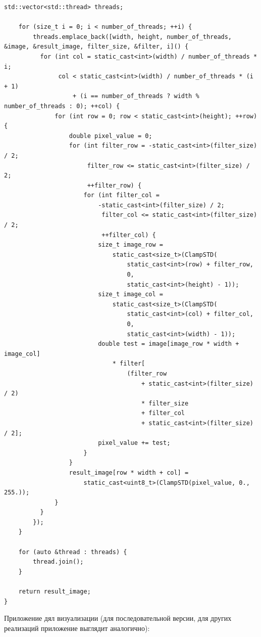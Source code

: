 \documentclass{report}
\begin{document}
\begin{lstlisting}[breaklines=true]
    std::vector<std::thread> threads;

    for (size_t i = 0; i < number_of_threads; ++i) {
        threads.emplace_back([width, height, number_of_threads, &image, &result_image, filter_size, &filter, i]() {
          for (int col = static_cast<int>(width) / number_of_threads * i;
               col < static_cast<int>(width) / number_of_threads * (i + 1)
                   + (i == number_of_threads ? width % number_of_threads : 0); ++col) {
              for (int row = 0; row < static_cast<int>(height); ++row) {
                  double pixel_value = 0;
                  for (int filter_row = -static_cast<int>(filter_size) / 2;
                       filter_row <= static_cast<int>(filter_size) / 2;
                       ++filter_row) {
                      for (int filter_col =
                          -static_cast<int>(filter_size) / 2;
                           filter_col <= static_cast<int>(filter_size) / 2;
                           ++filter_col) {
                          size_t image_row =
                              static_cast<size_t>(ClampSTD(
                                  static_cast<int>(row) + filter_row,
                                  0,
                                  static_cast<int>(height) - 1));
                          size_t image_col =
                              static_cast<size_t>(ClampSTD(
                                  static_cast<int>(col) + filter_col,
                                  0,
                                  static_cast<int>(width) - 1));
                          double test = image[image_row * width + image_col]
                              * filter[
                                  (filter_row
                                      + static_cast<int>(filter_size) / 2)
                                      * filter_size
                                      + filter_col
                                      + static_cast<int>(filter_size) / 2];
                          pixel_value += test;
                      }
                  }
                  result_image[row * width + col] =
                      static_cast<uint8_t>(ClampSTD(pixel_value, 0., 255.));
              }
          }
        });
    }

    for (auto &thread : threads) {
        thread.join();
    }

    return result_image;
}
\end{lstlisting}

Приложение дял визуализации (для последовательной версии, для других реализаций приложение выглядит аналогично):
\end{document}
